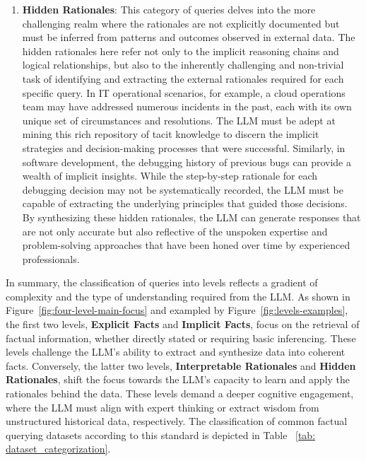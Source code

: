 \begin{enumerate}[label=\textbf{Level-\arabic*}]
    \item \textbf{Hidden Rationales}: This category of queries delves into the more challenging realm where the rationales are not explicitly documented but must be inferred from patterns and outcomes observed in external data. The hidden rationales here refer not only to the implicit reasoning chains and logical relationships, but also to the inherently challenging and non-trivial task of identifying and extracting the external rationales required for each specific query. In IT operational scenarios, for example, a cloud operations team may have addressed numerous incidents in the past, each with its own unique set of circumstances and resolutions. The LLM must be adept at mining this rich repository of tacit knowledge to discern the implicit strategies and decision-making processes that were successful. Similarly, in software development, the debugging history of previous bugs can provide a wealth of implicit insights. While the step-by-step rationale for each debugging decision may not be systematically recorded, the LLM must be capable of extracting the underlying principles that guided those decisions. By synthesizing these hidden rationales, the LLM can generate responses that are not only accurate but also reflective of the unspoken expertise and problem-solving approaches that have been honed over time by experienced professionals.

\end{enumerate}



In summary, the classification of queries into levels reflects a gradient of complexity and the type of understanding required from the LLM. As shown in Figure~\ref{fig:four-level-main-focus} and exampled by Figure~\ref{fig:levels-examples}, the first two levels, \textbf{Explicit Facts} and \textbf{Implicit Facts}, focus on the retrieval of factual information, whether directly stated or requiring basic inferencing. These levels challenge the LLM's ability to extract and synthesize data into coherent facts.
Conversely, the latter two levels, \textbf{Interpretable Rationales} and \textbf{Hidden Rationales}, shift the focus towards the LLM's capacity to learn and apply the rationales behind the data. These levels demand a deeper cognitive engagement, where the LLM must align with expert thinking or extract wisdom from unstructured historical data, respectively. The classification of common factual querying datasets according to this standard is depicted in Table ~\ref{tab: dataset_categorization}.

